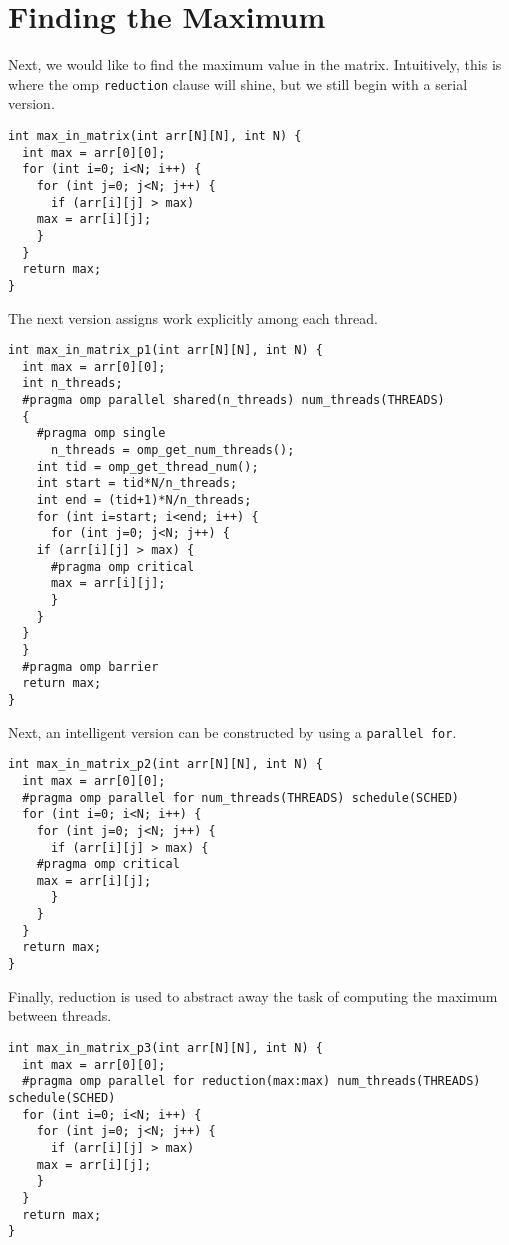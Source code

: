 \documentclass[11pt]{article}
\begin{document}
\section{Finding the Maximum}
\label{sec-2}

Next, we would like to find the maximum value in the
matrix. Intuitively, this is where the omp \verb~reduction~ clause will
shine, but we still begin with a serial version.

\begin{verbatim}
int max_in_matrix(int arr[N][N], int N) {
  int max = arr[0][0];
  for (int i=0; i<N; i++) {
    for (int j=0; j<N; j++) {
      if (arr[i][j] > max)
	max = arr[i][j];
    }
  }
  return max;
}
\end{verbatim}

The next version assigns work explicitly among each thread.

\begin{verbatim}
int max_in_matrix_p1(int arr[N][N], int N) {
  int max = arr[0][0];
  int n_threads;
  #pragma omp parallel shared(n_threads) num_threads(THREADS)
  {
    #pragma omp single
      n_threads = omp_get_num_threads();
    int tid = omp_get_thread_num();
    int start = tid*N/n_threads;
    int end = (tid+1)*N/n_threads;
    for (int i=start; i<end; i++) {
      for (int j=0; j<N; j++) {
	if (arr[i][j] > max) {
	  #pragma omp critical
	  max = arr[i][j];
      }
    }
  }
  }
  #pragma omp barrier
  return max;
}
\end{verbatim}

Next, an intelligent version can be constructed by using a \verb~parallel for~.

\begin{verbatim}
int max_in_matrix_p2(int arr[N][N], int N) {
  int max = arr[0][0];
  #pragma omp parallel for num_threads(THREADS) schedule(SCHED)
  for (int i=0; i<N; i++) {
    for (int j=0; j<N; j++) {
      if (arr[i][j] > max) {
	#pragma omp critical
	max = arr[i][j];
      }
    }
  }
  return max;
}
\end{verbatim}

Finally, reduction is used to abstract away the task of computing the
maximum between threads.

\begin{verbatim}
int max_in_matrix_p3(int arr[N][N], int N) {
  int max = arr[0][0];
  #pragma omp parallel for reduction(max:max) num_threads(THREADS) schedule(SCHED)
  for (int i=0; i<N; i++) {
    for (int j=0; j<N; j++) {
      if (arr[i][j] > max)
	max = arr[i][j];
    }
  }
  return max;
}
\end{verbatim}
\end{document}

